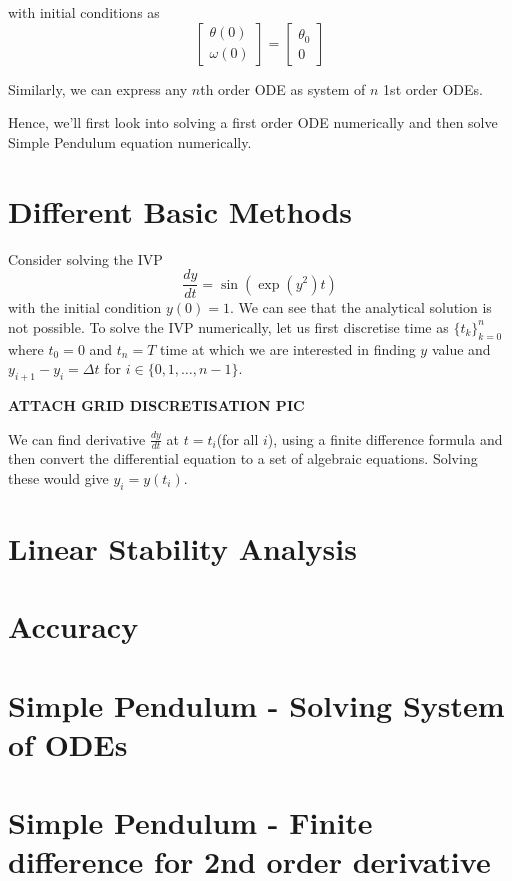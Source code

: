 \documentclass[
]{book}
\begin{document}
with initial conditions as
\begin{equation}
\begin{bmatrix} \theta(0) \\  \omega(0) \end{bmatrix}=\begin{bmatrix} \theta_0 \\  0 \end{bmatrix}
\end{equation}

Similarly, we can express any \(n\)th order ODE as system of \(n\) 1st order ODEs.

Hence, we'll first look into solving a first order ODE numerically and then solve Simple Pendulum equation numerically.

\hypertarget{different-basic-methods}{%
\section{Different Basic Methods}\label{different-basic-methods}}

Consider solving the IVP
\begin{equation}
\frac{dy}{dt} = \sin(\exp(y^2)t)
\end{equation}
with the initial condition \(y(0) = 1\). We can see that the analytical solution is not possible. To solve the IVP numerically, let us first discretise time as \(\{t_k\}_{k=0}^n\) where \(t_0 = 0\) and \(t_n=T\) time at which we are interested in finding \(y\) value and \(y_{i+1}-y_i = \Delta t\) for \(i\in\{0,1,\dots,n-1\}\).

\textbf{ATTACH GRID DISCRETISATION PIC}

We can find derivative \(\frac{dy}{dt}\) at \(t=t_i\)(for all \(i\)), using a finite difference formula and then convert the differential equation to a set of algebraic equations. Solving these would give \(y_i = y(t_i)\).

\hypertarget{linear-stability-analysis}{%
\section{Linear Stability Analysis}\label{linear-stability-analysis}}

\hypertarget{accuracy-1}{%
\section{Accuracy}\label{accuracy-1}}

\hypertarget{simple-pendulum---solving-system-of-odes}{%
\section{Simple Pendulum - Solving System of ODEs}\label{simple-pendulum---solving-system-of-odes}}

\hypertarget{simple-pendulum---finite-difference-for-2nd-order-derivative}{%
\section{Simple Pendulum - Finite difference for 2nd order derivative}\label{simple-pendulum---finite-difference-for-2nd-order-derivative}}

  
\end{document}
